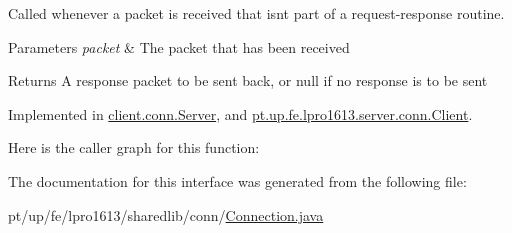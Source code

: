 Called whenever a packet is received that isn\textquotesingle{}t part of a request-\/response routine.


\begin{DoxyParams}{Parameters}
{\em packet} & The packet that has been received \\
\hline
\end{DoxyParams}
\begin{DoxyReturn}{Returns}
A response packet to be sent back, or null if no response is to be sent 
\end{DoxyReturn}


Implemented in \hyperlink{classclient_1_1conn_1_1_server_a620def50e5115d3798407dfff5433ead}{client.\+conn.\+Server}, and \hyperlink{classpt_1_1up_1_1fe_1_1lpro1613_1_1server_1_1conn_1_1_client_a81efbd1e6b06189da5c814ac767a4a98}{pt.\+up.\+fe.\+lpro1613.\+server.\+conn.\+Client}.

Here is the caller graph for this function\+:


The documentation for this interface was generated from the following file\+:\begin{DoxyCompactItemize}
\item 
pt/up/fe/lpro1613/sharedlib/conn/\hyperlink{_connection_8java}{Connection.\+java}\end{DoxyCompactItemize}
